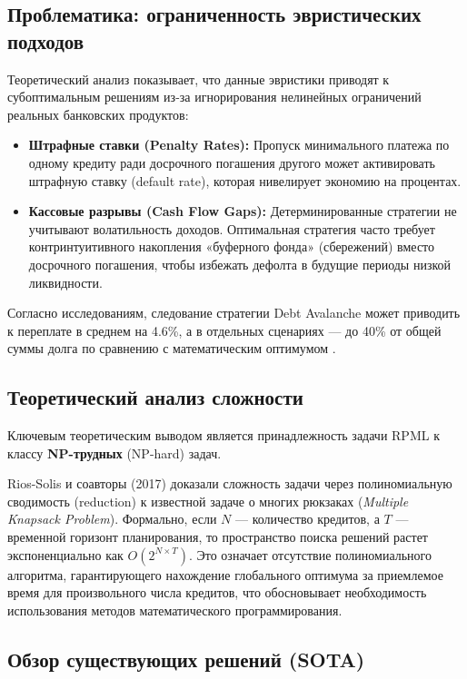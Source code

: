 \documentclass[12pt, a4paper]{report}
\begin{document}
\subsection{Проблематика: ограниченность эвристических подходов}

Теоретический анализ показывает, что данные эвристики приводят к субоптимальным решениям из-за игнорирования нелинейных ограничений реальных банковских продуктов:
\begin{itemize}
    \item \textbf{Штрафные ставки (Penalty Rates):} Пропуск минимального платежа по одному кредиту ради досрочного погашения другого может активировать штрафную ставку (default rate), которая нивелирует экономию на процентах.
    \item \textbf{Кассовые разрывы (Cash Flow Gaps):} Детерминированные стратегии не учитывают волатильность доходов. Оптимальная стратегия часто требует контринтуитивного накопления «буферного фонда» (сбережений) вместо досрочного погашения, чтобы избежать дефолта в будущие периоды низкой ликвидности.
\end{itemize}

Согласно исследованиям, следование стратегии Debt Avalanche может приводить к переплате в среднем на 4.6\%, а в отдельных сценариях — до 40\% от общей суммы долга по сравнению с математическим оптимумом \cite{rios2017}.

\subsection{Теоретический анализ сложности}

Ключевым теоретическим выводом является принадлежность задачи RPML к классу \textbf{NP-трудных} (NP-hard) задач. 

Rios-Solis и соавторы (2017) доказали сложность задачи через полиномиальную сводимость (reduction) к известной задаче о многих рюкзаках (\textit{Multiple Knapsack Problem}). Формально, если $N$ — количество кредитов, а $T$ — временной горизонт планирования, то пространство поиска решений растет экспоненциально как $O(2^{N \times T})$. Это означает отсутствие полиномиального алгоритма, гарантирующего нахождение глобального оптимума за приемлемое время для произвольного числа кредитов, что обосновывает необходимость использования методов математического программирования.

\subsection{Обзор существующих решений (SOTA)}
\end{document}

